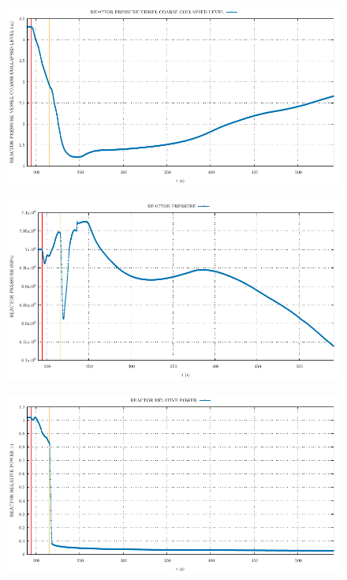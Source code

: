 \documentclass{article}
\begin{document}
\begin{multicols}{2}
\begin{figure}[H]
\end{figure}
\begin{figure}[H]
\centering
\includegraphics[width=\linewidth]{./graphs/REACTOR PRESSURE VESSEL COARSE COLLAPSED LEVEL_comp.pdf}
\end{figure}
\begin{figure}[H]
\centering
\includegraphics[width=\linewidth]{./graphs/REACTOR PRESSURE_comp.pdf}
\end{figure}
\begin{figure}[H]
\centering
\includegraphics[width=\linewidth]{./graphs/REACTOR RELATIVE POWER_comp.pdf}

\end{figure}
\end{multicols}
\end{document}
